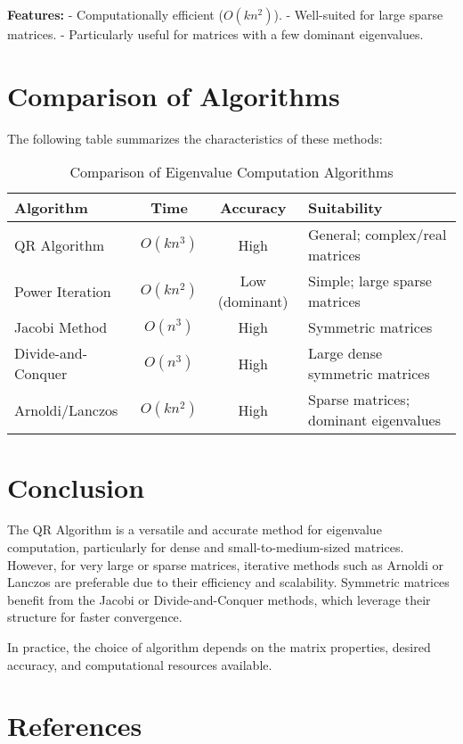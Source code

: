 \documentclass[12pt]{article}
\begin{document}
\textbf{Features:}
- Computationally efficient (\( O(kn^2) \)).
- Well-suited for large sparse matrices.
- Particularly useful for matrices with a few dominant eigenvalues.

\section*{Comparison of Algorithms}
The following table summarizes the characteristics of these methods:

\begin{table}[h!]
\centering
\begin{tabular}{|l|c|c|l|}
\hline
\textbf{Algorithm}        & \textbf{Time} & \textbf{Accuracy} & \textbf{Suitability} \\ \hline
QR Algorithm              & \( O(kn^3) \) & High              & General; complex/real matrices \\ \hline
Power Iteration           & \( O(kn^2) \) & Low (dominant)    & Simple; large sparse matrices  \\ \hline
Jacobi Method             & \( O(n^3) \)  & High              & Symmetric matrices             \\ \hline
Divide-and-Conquer        & \( O(n^3) \)  & High              & Large dense symmetric matrices \\ \hline
Arnoldi/Lanczos           & \( O(kn^2) \) & High              & Sparse matrices; dominant eigenvalues \\ \hline
\end{tabular}
\label{tab:eigen-algorithms}
\caption{Comparison of Eigenvalue Computation Algorithms}
\end{table}

\section*{Conclusion}
The QR Algorithm is a versatile and accurate method for eigenvalue computation, particularly for dense and small-to-medium-sized matrices. However, for very large or sparse matrices, iterative methods such as Arnoldi or Lanczos are preferable due to their efficiency and scalability. Symmetric matrices benefit from the Jacobi or Divide-and-Conquer methods, which leverage their structure for faster convergence. 

In practice, the choice of algorithm depends on the matrix properties, desired accuracy, and computational resources available.

\section*{References}
\end{document}
